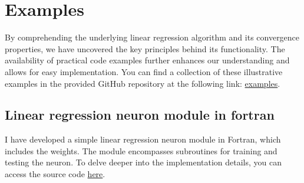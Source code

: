 \section{Examples}
By comprehending the underlying linear regression algorithm
and its convergence properties, we have uncovered the key principles
behind its functionality. The availability of practical code examples further enhances our understanding and
allows for easy implementation. You can find a collection of these illustrative examples in the provided
GitHub repository at the following link:
\href{https://github.com/alecksandr26/fortran-ml/tree/main/examples}{examples}.
\subsection{Linear regression neuron module in fortran}
I have developed a simple linear regression neuron  module in Fortran, which includes the weights.
The module encompasses subroutines for training and testing the
neuron. To delve deeper into the implementation details, you can access the source code
\href{https://github.com/alecksandr26/fortran-ml/tree/main/src/mod_linear_regression.f90}{here}.

